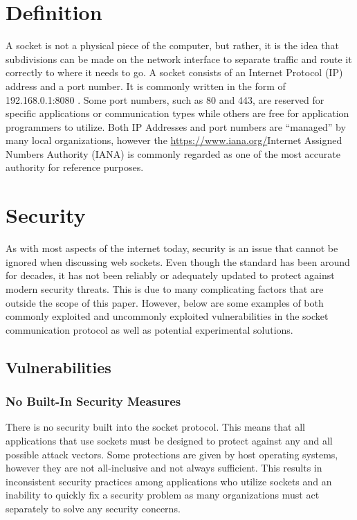\documentclass[conference, 12pt]{IEEEtran}
\begin{document}
\section{Definition}
A socket is not a physical piece of the computer, but rather, it is the idea that subdivisions can be made on the network interface to separate traffic and route it correctly to where it needs to go. A socket consists of an Internet Protocol (IP) address and a port number. It is commonly written in the form of 192.168.0.1:8080 \cite{Goralski}. Some port numbers, such as 80 and 443, are reserved for specific applications or communication types while others are free for application programmers to utilize. Both IP Addresses and port numbers are “managed” by many local organizations, however the \url{https://www.iana.org/}{Internet Assigned Numbers Authority} (IANA) is commonly regarded as one of the most accurate authority for reference purposes.

\section{Security}
As with most aspects of the internet today, security is an issue that cannot be ignored when discussing web sockets. Even though the standard has been around for decades, it has not been reliably or adequately updated to protect against modern security threats. This is due to many complicating factors that are outside the scope of this paper. However, below are some examples of both commonly exploited and uncommonly exploited vulnerabilities in the socket communication protocol as well as potential experimental solutions.

\subsection{Vulnerabilities}

\subsubsection{No Built-In Security Measures}
There is no security built into the socket protocol. This means that all applications that use sockets must be designed to protect against any and all possible attack vectors. Some protections are given by host operating systems, however they are not all-inclusive and not always sufficient. This results in inconsistent security practices among applications who utilize sockets and an inability to quickly fix a security problem as many organizations must act separately to solve any security concerns.
\end{document}
